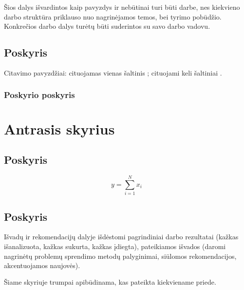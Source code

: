 \documentclass[fleqn]{VUMIFKompMagistrinis}
\begin{document}
Šios dalys išvardintos kaip pavyzdys ir nebūtinai turi būti darbe, nes
kiekvieno darbo struktūra priklauso nuo nagrinėjamos temos, bei tyrimo
pobūdžio. Konkrečios darbo dalys turėtų būti suderintos su savo darbo vadovu.

\subsection{Poskyris}
Citavimo pavyzdžiai: cituojamas vienas šaltinis \cite{PvzStraipsnLt}; cituojami
keli šaltiniai \cite{PvzStraipsnEn, PvzKonfLt, PvzKonfEn, PvzKnygLt, PvzKnygEn,
PvzElPubLt, PvzElPubEn, PvzMagistrLt, PvzPhdEn}.

\subsubsection{Poskyrio poskyris}
\section{Antrasis skyrius}
\subsection{Poskyris}
\begin{equation}\label{eq:pavyzdys}
    y = \sum_{i=1}^N x_i
\end{equation}

\subsection{Poskyris}

Išvadų ir rekomendacijų dalyje išdėstomi pagrindiniai darbo rezultatai (kažkas
išanalizuota, kažkas sukurta, kažkas įdiegta), pateikiamos išvados (daromi
nagrinėtų problemų sprendimo metodų palyginimai, siūlomos rekomendacijos,
akcentuojamos naujovės).


\printbibliography[heading=bibintoc]  %

Šiame skyriuje trumpai apibūdinama, kas pateikta kiekviename priede.

\end{document}
